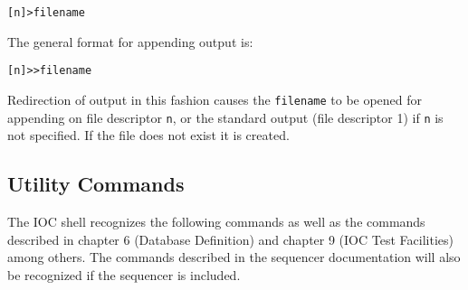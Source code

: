 \begin{verbatim}
[n]>filename
\end{verbatim}

 The general format for appending output is:

\begin{verbatim}
[n]>>filename
\end{verbatim}

Redirection of output in this fashion causes the \verb|filename| to be opened for appending on file descriptor \verb|n|, or the standard output (file descriptor 1) if \verb|n| is not specified.
If the file does not exist it is created.

\subsection{Utility Commands}
\label{Utility Commands}

The IOC shell recognizes the following commands as well as the commands described in chapter 6 (Database Definition) and chapter 9 (IOC Test Facilities) among others.
The commands described in the sequencer documentation will also be recognized if the sequencer is included.

